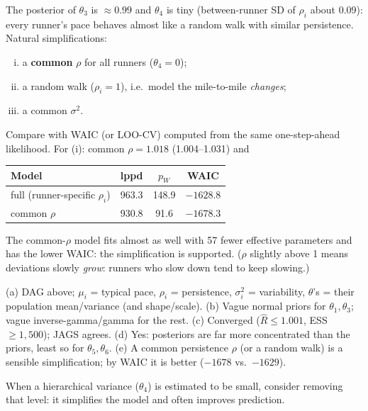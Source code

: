 \documentclass[11pt]{article}
\begin{document}
The posterior of $\theta_3$ is $\approx0.99$ and $\theta_4$ is tiny (between-runner SD of $\rho_i$ about 0.09): every runner's pace behaves almost like a random walk with similar persistence. Natural simplifications:
\begin{enumerate}[(i)]
\item a \textbf{common} $\rho$ for all runners ($\theta_4=0$);
\item a random walk ($\rho_i=1$), i.e.\ model the mile-to-mile \emph{changes};
\item a common $\sigma^2$.
\end{enumerate}
Compare with WAIC (or LOO-CV) computed from the same one-step-ahead likelihood. For (i): common $\rho=1.018$ (1.004--1.031) and
\begin{center}
\begin{tabular}{lccc}\toprule
Model & lppd & $p_W$ & WAIC\\\midrule
full (runner-specific $\rho_i$) & 963.3 & 148.9 & $-1628.8$\\
common $\rho$ & 930.8 & 91.6 & $\mathbf{-1678.3}$\\\bottomrule
\end{tabular}
\end{center}
The common-$\rho$ model fits almost as well with 57 fewer effective parameters and has the lower WAIC: the simplification is supported. ($\rho$ slightly above 1 means deviations slowly \emph{grow}: runners who slow down tend to keep slowing.)

\begin{answer}
(a) DAG above; $\mu_i$ = typical pace, $\rho_i$ = persistence, $\sigma_i^2$ = variability, $\theta$'s = their population mean/variance (and shape/scale). (b) Vague normal priors for $\theta_1,\theta_3$; vague inverse-gamma/gamma for the rest. (c) Converged ($\hat R\le1.001$, ESS $\ge1{,}500$); JAGS agrees. (d) Yes: posteriors are far more concentrated than the priors, least so for $\theta_5,\theta_6$. (e) A common persistence $\rho$ (or a random walk) is a sensible simplification; by WAIC it is better ($-1678$ vs.\ $-1629$).
\end{answer}

\begin{takeaway}
When a hierarchical variance ($\theta_4$) is estimated to be small, consider removing that level: it simplifies the model and often improves prediction.
\end{takeaway}

\end{document}
